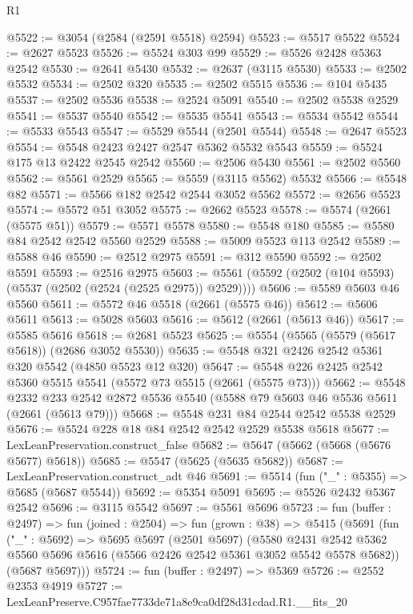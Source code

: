 \begin{lexlean}{R1}
\begin{coremodule}
@5522 := @3054 (@2584 (@2591 @5518) @2594)
@5523 := @5517 @5522
@5524 := @2627 @5523
@5526 := @5524 @303 @99
@5529 := @5526 @2428 @5363 @2542
@5530 := @2641 @5430
@5532 := @2637 (@3115 @5530)
@5533 := @2502 @5532
@5534 := @2502 @320
@5535 := @2502 @5515
@5536 := @104 @5435
@5537 := @2502 @5536
@5538 := @2524 @5091
@5540 := @2502 @5538 @2529
@5541 := @5537 @5540
@5542 := @5535 @5541
@5543 := @5534 @5542
@5544 := @5533 @5543
@5547 := @5529 @5544 (@2501 @5544)
@5548 := @2647 @5523
@5554 := @5548 @2423 @2427 @2547 @5362 @5532 @5543
@5559 := @5524 @175 @13 @2422 @2545 @2542
@5560 := @2506 @5430
@5561 := @2502 @5560
@5562 := @5561 @2529
@5565 := @5559 (@3115 @5562) @5532
@5566 := @5548 @82
@5571 := @5566 @182 @2542 @2544 @3052 @5562
@5572 := @2656 @5523
@5574 := @5572 @51 @3052
@5575 := @2662 @5523
@5578 := @5574 (@2661 (@5575 @51))
@5579 := @5571 @5578
@5580 := @5548 @180
@5585 := @5580 @84 @2542 @2542 @5560 @2529
@5588 := @5009 @5523 @113 @2542
@5589 := @5588 @46
@5590 := @2512 @2975
@5591 := @312 @5590
@5592 := @2502 @5591
@5593 := @2516 @2975
@5603 := @5561 (@5592 (@2502 (@104 @5593) (@5537 (@2502 (@2524 (@2525 @2975)) @2529))))
@5606 := @5589 @5603 @46 @5560
@5611 := @5572 @46 @5518 (@2661 (@5575 @46))
@5612 := @5606 @5611
@5613 := @5028 @5603
@5616 := @5612 (@2661 (@5613 @46))
@5617 := @5585 @5616
@5618 := @2681 @5523
@5625 := @5554 (@5565 (@5579 (@5617 @5618)) (@2686 @3052 @5530))
@5635 := @5548 @321 @2426 @2542 @5361 @320 @5542 (@4850 @5523 @12 @320)
@5647 := @5548 @226 @2425 @2542 @5360 @5515 @5541 (@5572 @73 @5515 (@2661 (@5575 @73)))
@5662 := @5548
    @2332
    @233
    @2542
    @2872
    @5536
    @5540
    (@5588 @79 @5603 @46 @5536 @5611 (@2661 (@5613 @79)))
@5668 := @5548 @231 @84 @2544 @2542 @5538 @2529
@5676 := @5524 @228 @18 @84 @2542 @2542 @2529 @5538 @5618
@5677 := LexLeanPreservation.construct_false
@5682 := @5647 (@5662 (@5668 (@5676 @5677) @5618))
@5685 := @5547 (@5625 (@5635 @5682))
@5687 := LexLeanPreservation.construct_adt @46
@5691 := @5514 (fun ("_" : @5355) => @5685 (@5687 @5544))
@5692 := @5354 @5091
@5695 := @5526 @2432 @5367 @2542
@5696 := @3115 @5542
@5697 := @5561 @5696
@5723 := fun (buffer : @2497) =>
  fun (joined : @2504) =>
  fun (grown : @38) =>
  @5415
    (@5691
      (fun ("_" : @5692) =>
      @5695
        @5697
        (@2501 @5697)
        (@5580
          @2431
          @2542
          @5362
          @5560
          @5696
          @5616
          (@5566 @2426 @2542 @5361 @3052 @5542 @5578 @5682))
        (@5687 @5697)))
@5724 := fun (buffer : @2497) => @5369
@5726 := @2552 @2353 @4919
@5727 := LexLeanPreserve.C957fae7733de71a8e9ca0df28d31cdad.R1.__fits_20

\end{coremodule}
\end{lexlean}
